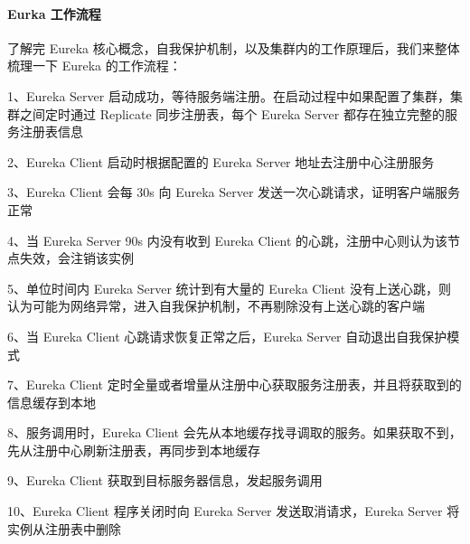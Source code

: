 \documentclass[../../../interview-questions.tex]{subfiles}
\begin{document}
\paragraph{Eurka 工作流程}

了解完 Eureka 核心概念，自我保护机制，以及集群内的工作原理后，我们来整体梳理一下 Eureka 的工作流程：

1、Eureka Server 启动成功，等待服务端注册。在启动过程中如果配置了集群，集群之间定时通过 Replicate 同步注册表，每个 Eureka Server 都存在独立完整的服务注册表信息

2、Eureka Client 启动时根据配置的 Eureka Server 地址去注册中心注册服务

3、Eureka Client 会每 30s 向 Eureka Server 发送一次心跳请求，证明客户端服务正常

4、当 Eureka Server 90s 内没有收到 Eureka Client 的心跳，注册中心则认为该节点失效，会注销该实例

5、单位时间内 Eureka Server 统计到有大量的 Eureka Client 没有上送心跳，则认为可能为网络异常，进入自我保护机制，不再剔除没有上送心跳的客户端

6、当 Eureka Client 心跳请求恢复正常之后，Eureka Server 自动退出自我保护模式

7、Eureka Client 定时全量或者增量从注册中心获取服务注册表，并且将获取到的信息缓存到本地

8、服务调用时，Eureka Client 会先从本地缓存找寻调取的服务。如果获取不到，先从注册中心刷新注册表，再同步到本地缓存

9、Eureka Client 获取到目标服务器信息，发起服务调用

10、Eureka Client 程序关闭时向 Eureka Server 发送取消请求，Eureka Server 将实例从注册表中删除
\end{document}
